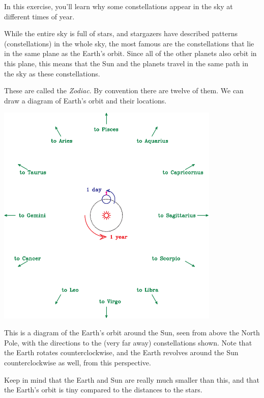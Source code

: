\documentclass[12pt]{article}
\begin{document}
\Large
\centerline{}

\normalsize

In this exercise, you'll learn why some constellations appear in the sky at different times of year.

While the entire sky is full of stars, and stargazers have described patterns (constellations) in the whole sky, the most famous are the constellations that lie in the same plane as the Earth's orbit. Since all of the other planets also orbit in this plane, this means that the Sun and the planets travel in the same path in the sky as these constellations.

These are called the {\it Zodiac}. By convention there are twelve of them. We can draw a diagram of Earth's orbit and their locations. 
\begin{center}
\includegraphics[width=0.8\textwidth]{earth-orbit-crop.pdf}
\end{center}

This is a diagram of the Earth's orbit around the Sun, seen from above the North Pole, with the directions to the (very far away) constellations shown. Note that the Earth rotates counterclockwise, and the Earth revolves around the Sun counterclockwise as well, from this perspective.

Keep in mind that the Earth and Sun are really much smaller than this, and that the Earth's orbit is tiny compared to the distances to the stars.


\newpage
\end{document}
